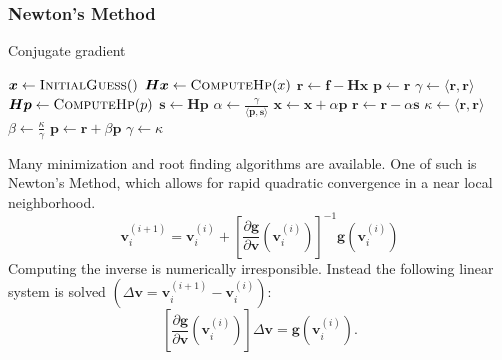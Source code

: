 \documentclass[m,times]{cgMA}
\begin{document}
\subsubsection{Newton's Method}\label{sec:newton}
\newcommand{\var}[1]{{\ttfamily#1}}%
\begin{algorithm}[t]
  \caption{Conjugate gradient}\label{alg:conj_grad}
  \begin{algorithmic}[1]
    \State $\boldsymbol{x} \gets \Call{InitialGuess}$
    \State $\boldsymbol{Hx} \gets \Call{ComputeHp}{x}$
    \State $\boldsymbol{r}\gets \boldsymbol{f} - \boldsymbol{Hx}$
    \State $\boldsymbol{p}\gets \boldsymbol{r}$
    \State $\gamma \gets \langle \boldsymbol { r } , \boldsymbol { r } \rangle$
    \Repeat
      \State $\boldsymbol{Hp} \gets \Call{ComputeHp}{p}$
      \State $\boldsymbol { s } \gets \boldsymbol { H } \boldsymbol { p }$
      \State $\alpha \gets \frac { \gamma } { \langle \boldsymbol { p } , \boldsymbol { s } \rangle }$
      \State $\boldsymbol { x } \gets \boldsymbol { x } + \alpha \boldsymbol { p }$
      \State $\boldsymbol { r } \leftarrow \boldsymbol { r } - \alpha \boldsymbol { s }$
      \State $\kappa \leftarrow \langle \boldsymbol { r } , \boldsymbol { r } \rangle$
      \If{$ \kappa < \epsilon$} 
        \State \Return \label{alg:conj_grad:exit}
      \EndIf
      \State $\beta \gets \frac{\kappa}{\gamma}$
      \State $\boldsymbol { p } \leftarrow \boldsymbol { r } + \beta \boldsymbol { p }$
      \State $\gamma \gets \kappa$
       
    \EndProcedure
  \end{algorithmic}
\end{algorithm}
Many minimization and root finding algorithms are available. One of such is Newton's Method, which allows for rapid quadratic convergence in a near local neighborhood.
\begin{equation}
  \boldsymbol{v}_i^{(i+1)} = \boldsymbol{v}^{(i)}_i + \left[\frac{\partial \boldsymbol{g}}{\partial \boldsymbol{v}}\left(\boldsymbol{v}^{(i)}_i\right)\right]^{-1}\boldsymbol{g}\left(\boldsymbol{v}^{(i)}_i\right)
\end{equation}
Computing the inverse is numerically irresponsible. Instead the following linear system is solved $\left(\Delta \boldsymbol{v} = \boldsymbol{v}_i^{(i+1)} - \boldsymbol{v}^{(i)}_i\right)$:
\begin{equation}\label{eq:linear_system}
  \left[\frac{\partial \boldsymbol{g}}{\partial \boldsymbol{v}}\left(\boldsymbol{v}^{(i)}_i\right)\right] \Delta \boldsymbol{v} =  \boldsymbol{g}\left(\boldsymbol{v}^{(i)}_i\right).
\end{equation}
\end{document}
